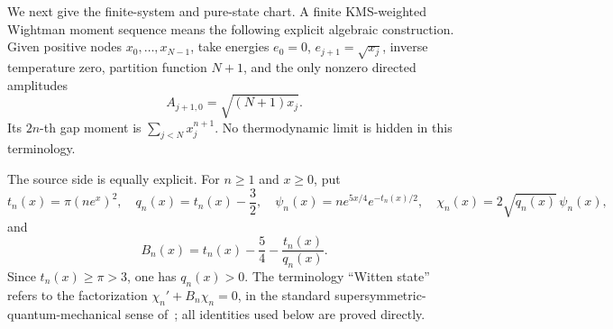 \documentclass[11pt]{article}
\begin{document}
We next give the finite-system and pure-state chart.  A finite KMS-weighted Wightman moment
sequence means the following explicit algebraic construction.  Given positive nodes
$x_0,\ldots,x_{N-1}$, take energies $e_0=0$, $e_{j+1}=\sqrt{x_j}$, inverse temperature zero,
partition function $N+1$, and the only nonzero directed amplitudes
\[
 A_{j+1,0}=\sqrt{(N+1)x_j}.
 \tag{9.11}
\]
Its $2n$-th gap moment is $\sum_{j<N}x_j^{n+1}$.  No thermodynamic limit is hidden in this
terminology.

The source side is equally explicit.  For $n\ge1$ and $x\ge0$, put
\[
 t_n(x)=\pi(ne^x)^2,\quad q_n(x)=t_n(x)-\frac32,\quad
 \psi_n(x)=ne^{5x/4}e^{-t_n(x)/2},\quad
 \chi_n(x)=2\sqrt{q_n(x)}\,\psi_n(x),
 \tag{9.12}
\]
and
\[
 B_n(x)=t_n(x)-\frac54-\frac{t_n(x)}{q_n(x)}.
 \tag{9.13}
\]
Since $t_n(x)\ge\pi>3$, one has $q_n(x)>0$.  The terminology ``Witten state'' refers to the
factorization $\chi_n'+B_n\chi_n=0$, in the standard supersymmetric-quantum-mechanical sense
of~\cite{Witten1982}; all identities used below are proved directly.
\end{document}
